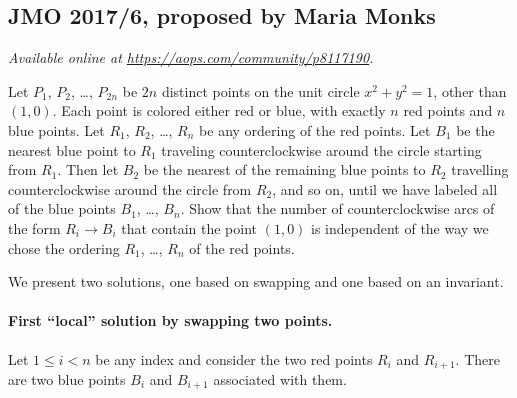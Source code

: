 \documentclass[11pt]{scrartcl}
\begin{document}
\subsection{JMO 2017/6, proposed by Maria Monks}
\textsl{Available online at \url{https://aops.com/community/p8117190}.}
\begin{mdframed}[style=mdpurplebox,frametitle={Problem statement}]
Let $P_1$, $P_2$, \dots, $P_{2n}$ be $2n$ distinct points on the
unit circle $x^2+y^2=1$, other than $(1,0)$.
Each point is colored either red or blue,
with exactly $n$ red points and $n$ blue points.
Let $R_1$, $R_2$, \dots, $R_n$ be any ordering of the red points.
Let $B_1$ be the nearest blue point to $R_1$ traveling
counterclockwise around the circle starting from $R_1$.
Then let $B_2$ be the nearest of the remaining blue points to $R_2$
travelling counterclockwise around the circle from $R_2$, and so on,
until we have labeled all of the blue points $B_1$, \dots, $B_n$.
Show that the number of counterclockwise arcs of the form $R_i \to B_i$
that contain the point $(1,0)$ is independent of the way we chose the
ordering $R_1$, \dots, $R_n$ of the red points.
\end{mdframed}
We present two solutions, one based on
swapping and one based on an invariant.

\paragraph{First ``local'' solution by swapping two points.}
Let $1 \le i < n$ be any index and consider the two red points
$R_i$ and $R_{i+1}$.
There are two blue points $B_i$ and $B_{i+1}$ associated with them.
\end{document}
